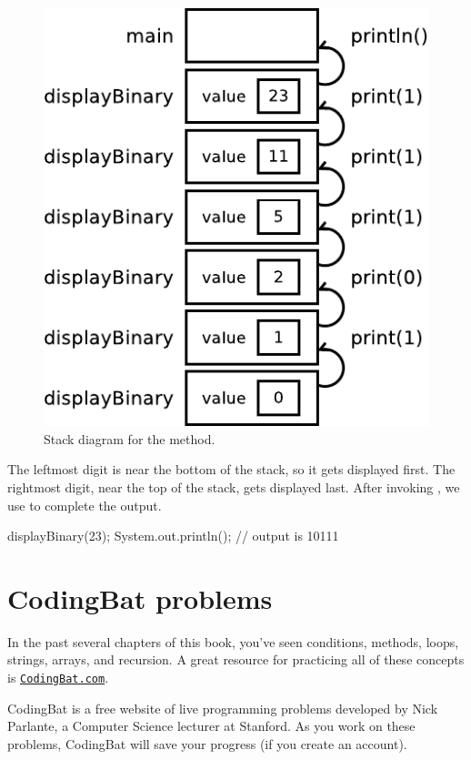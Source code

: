 \begin{figure}[!ht]
\begin{center}
\includegraphics[scale=0.8]{figs/stack4.pdf}
\caption{Stack diagram for the  method.}
\label{fig.stack4}
\end{center}
\end{figure}

The leftmost digit is near the bottom of the stack, so it gets displayed first.
The rightmost digit, near the top of the stack, gets displayed last.
After invoking , we use  to complete the output.

\begin{code}
displayBinary(23);
System.out.println();
// output is 10111
\end{code}


\section{CodingBat problems}

In the past several chapters of this book, you've seen conditions, methods, loops, strings, arrays, and recursion.
A great resource for practicing all of these concepts is \href{http://codingbat.com/java}{\tt CodingBat.com}.


CodingBat is a free website of live programming problems developed by Nick Parlante, a Computer Science lecturer at Stanford.
As you work on these problems, CodingBat will save your progress (if you create an account).

